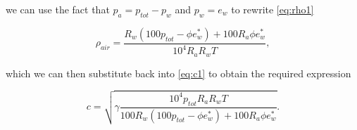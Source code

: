 \documentclass[11pt,titlepage]{report}
\begin{document}
we can use the fact that $p_a = p_{tot} - p_w$ and $p_w = e_w$ to rewrite \ref{eq:rho1}

\begin{equation} \label{eq:rho2}
	\rho_{air} = \frac{R_w(100 p_{tot} - \phi e^*_w) + 100 R_a \phi e^*_w}{10^4 R_a R_w T},
\end{equation}

which we can then substitute back into \ref{eq:c1} to obtain the required expression

\begin{equation} \label{eq:c2}
	c = \sqrt{\gamma \frac{10^4 p_{tot} R_a R_w T}{100 R_w(100 p_{tot} - \phi e^*_w) + 100 R_a \phi e^*_w}}.
\end{equation}
\cite{sengpiel-sound-speed,uiuc-rel-humid,wikipedia-speed-of-sound}
\end{document}
